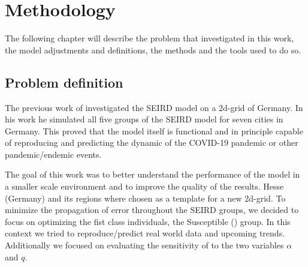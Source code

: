 
\chapter{Methodology} %
The following chapter will describe the problem that investigated in this work, the model adjustments and definitions,
the methods and the tools used to do so.

\label{chap:methodology} %


\section{Problem definition}
\label{sec:problemDef}

The previous work of \cite{Rastogi} investigated the SEIRD model on a 2d-grid of Germany. In his work he simulated
all five groups of the SEIRD model for seven cities in Germany. This proved that the model itself is functional and
in principle capable of reproducing and predicting the dynamic of the COVID-19 pandemic or other pandemic/endemic events. \newline

\par
The goal of this work was to better understand the performance of the model in a smaller scale environment and to improve
the quality of the results. Hesse (Germany) and its regions where chosen as a template for a new 2d-grid. To minimize the
propagation of error throughout the SEIRD groups, we decided to focus on optimizing the fist class individuals, the Susceptible () group.
In this context we tried to reproduce/predict real world data and upcoming trends. Additionally we focused on evaluating the
sensitivity of  to the two variables $\alpha$ and $q$.

